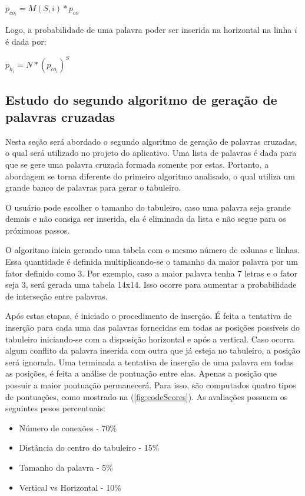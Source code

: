 \begin{center}
    \Large{$p_{co_{i}} = M(S,i)*p_{co}$}
\end{center}

Logo, a probabilidade de uma palavra poder ser inserida na horizontal na linha $i$ é dada por:

\begin{center}
    \Large{$p_{h_{i}} = N*(p_{co_{i}})^{S}$}
\end{center}

\subsection{Estudo do segundo algoritmo de geração de palavras cruzadas}
Nesta seção será abordado o segundo algoritmo de geração de palavras cruzadas, o qual será utilizado no projeto do aplicativo. Uma lista de palavras é dada para que se gere uma palavra cruzada formada somente por estas. Portanto, a abordagem se torna diferente do primeiro algoritmo analisado, o qual utiliza um grande banco de palavras para gerar o tabuleiro.

O usuário pode escolher o tamanho do tabuleiro, caso uma palavra seja grande demais e não consiga ser inserida, ela é eliminada da lista e não segue para os próximoas passos.

O algoritmo inicia gerando uma tabela com o mesmo número de colunas e linhas. Essa quantidade é definida multiplicando-se o tamanho da maior palavra por um fator definido como 3. Por exemplo, caso a maior palavra tenha 7 letras e o fator seja 3, será gerada uma tabela 14x14. Isso ocorre para aumentar a probabilidade de interseção entre palavras. 

Após estas etapas, é iniciado o procedimento de inserção. É feita a tentativa de inserção para cada uma das palavras fornecidas em todas as posições possíveis do tabuleiro iniciando-se com a disposição horizontal e após a vertical. Caso ocorra algum conflito da palavra inserida com outra que já esteja no tabuleiro, a posição será ignorada. Uma terminada a tentativa de inserção de uma palavra em todas as posições, é feita a análise de pontuação entre elas. Apenas a posição que possuir a maior pontuação permanecerá. Para isso, são computados quatro tipos de pontuações, como mostrado na (\autoref{fig:codeScores}). As avaliações possuem os seguintes pesos percentuais:

\begin{itemize}
    \item Número de conexões - 70\%
    \item Distância do centro do tabuleiro - 15\%
    \item Tamanho da palavra - 5\%
    \item Vertical vs Horizontal - 10\%
\end{itemize}


